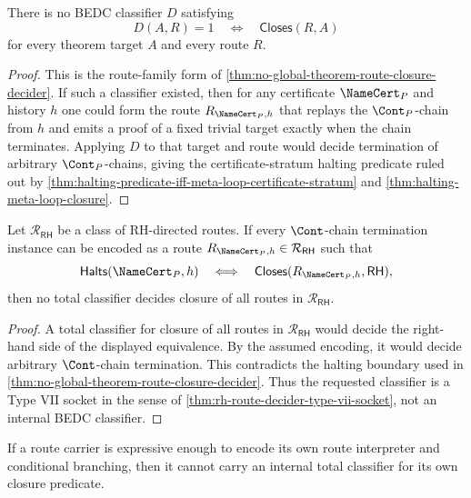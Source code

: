 \begin{theorem}
\label{thm:rh-no-total-route-closure-classifier}
There is no BEDC classifier $D$ satisfying
$$
D(A,R)=1
\quad\Longleftrightarrow\quad
\mathsf{Closes}(R,A)
$$
for every theorem target $A$ and every route $R$.
\end{theorem}

\begin{proof}
This is the route-family form of
\autoref{thm:no-global-theorem-route-closure-decider}. If such a
classifier existed, then for any certificate $\NameCert_P$ and history $h$
one could form the route $R_{\NameCert_P,h}$ that replays the
$\Cont_P$-chain from $h$ and emits a proof of a fixed trivial target
exactly when the chain terminates. Applying $D$ to that target and route
would decide termination of arbitrary $\Cont_P$-chains, giving the
certificate-stratum halting predicate ruled out by
\autoref{thm:halting-predicate-iff-meta-loop-certificate-stratum} and
\autoref{thm:halting-meta-loop-closure}.
\end{proof}

\begin{theorem}
\label{thm:rh-expressive-route-family-not-decidable}
Let $\mathcal R_{\mathsf{RH}}$ be a class of RH-directed routes. If every
$\Cont$-chain termination instance can be encoded as a route
$R_{\NameCert_P,h}\in\mathcal R_{\mathsf{RH}}$ such that
$$
\mathsf{Halts}(\NameCert_P,h)
\quad\Longleftrightarrow\quad
\mathsf{Closes}(R_{\NameCert_P,h},\mathsf{RH}),
$$
then no total classifier decides closure of all routes in
$\mathcal R_{\mathsf{RH}}$.
\end{theorem}

\begin{proof}
A total classifier for closure of all routes in
$\mathcal R_{\mathsf{RH}}$ would decide the right-hand side of the displayed
equivalence. By the assumed encoding, it would decide arbitrary
$\Cont$-chain termination. This contradicts the halting boundary used in
\autoref{thm:no-global-theorem-route-closure-decider}. Thus the requested
classifier is a Type VII socket in the sense of
\autoref{thm:rh-route-decider-type-vii-socket}, not an internal BEDC
classifier.
\end{proof}

\begin{theorem}
\label{thm:rh-diagonal-route-classifier-obstruction}
If a route carrier is expressive enough to encode its own route
interpreter and conditional branching, then it cannot carry an internal
total classifier for its own closure predicate.
\end{theorem}

